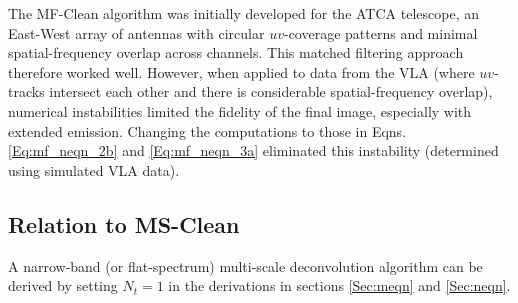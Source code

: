 \documentclass[structabstract]{stylefiles/aa}
\begin{document}
The MF-Clean algorithm was initially developed for the ATCA telescope,
an East-West array of antennas with circular $uv$-coverage patterns and minimal
spatial-frequency overlap across channels. This matched filtering approach therefore
worked well.  However, when applied to data from the VLA (where $uv$-tracks intersect
each other and there is considerable spatial-frequency overlap), numerical
instabilities limited the fidelity of the final image, especially with
extended emission.  Changing the computations
to those in Eqns.\ref{Eq:mf_neqn_2b} and \ref{Eq:mf_neqn_3a}
eliminated this instability (determined using simulated VLA data).





\subsection{Relation to MS-Clean}
A narrow-band (or flat-spectrum) multi-scale deconvolution algorithm can be derived by
setting $N_t=1$ in the derivations in sections \ref{Sec:meqn} and \ref{Sec:neqn}.
%
\end{document}
